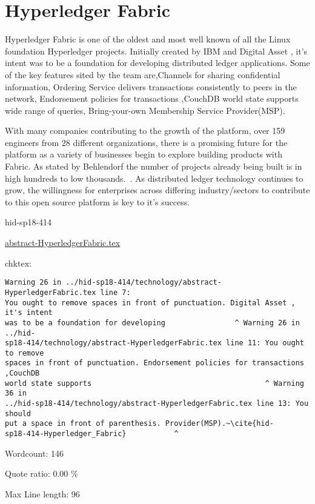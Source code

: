 \section{Hyperledger Fabric}


Hyperledger Fabric  is one of the oldest and most well known of all the
Linux foundation Hyperledger projects. Initially created by IBM and
Digital Asset , it's intent was to be a foundation for developing
distributed ledger applications. Some of the key features sited by the
team are,Channels for sharing confidential information, Ordering
Service delivers transactions consistently to peers in the network,
Endorsement policies for transactions ,CouchDB world state supports
wide range of queries, Bring-your-own Membership Service
Provider(MSP).~\cite{hid-sp18-414-Hyperledger_Fabric}

With many companies contributing to the growth of the platform, over
159 engineers from 28 different organizations, there is a promising future for the platform as a
variety of businesses begin to explore building products with
Fabric. As stated by Behlendorf the number of projects already being
built is in high hundreds to low thousands.~\cite{hid-sp18-414-Behlendorf_Interview}. 
As distributed ledger technology continues to grow, the
willingness for enterprises across differing industry/sectors to
contribute to this open source platform is key to it's success.



\begin{IU}

hid-sp18-414

\href{https://github.com/cloudmesh-community/hid-sp18-414/blob/master//technology/abstract-HyperledgerFabric.tex}{abstract-HyperledgerFabric.tex}

 
chktex:
\begin{tiny}
\begin{verbatim}
Warning 26 in ../hid-sp18-414/technology/abstract-HyperledgerFabric.tex line 7:
You ought to remove spaces in front of punctuation. Digital Asset , it's intent
was to be a foundation for developing                ^ Warning 26 in ../hid-
sp18-414/technology/abstract-HyperledgerFabric.tex line 11: You ought to remove
spaces in front of punctuation. Endorsement policies for transactions ,CouchDB
world state supports                                        ^ Warning 36 in
../hid-sp18-414/technology/abstract-HyperledgerFabric.tex line 13: You should
put a space in front of parenthesis. Provider(MSP).~\cite{hid-
sp18-414-Hyperledger_Fabric}           ^
\end{verbatim}
\end{tiny}

Wordcount: 146


Quote ratio: 0.00 \%
 
Max Line length: 96
\end{IU}

